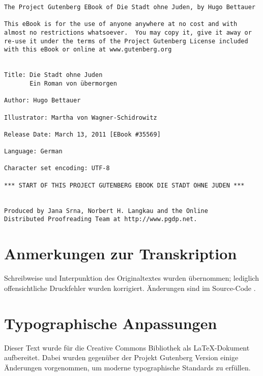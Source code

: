 \usepackage[german,ngerman]{babel}
\usepackage[T1]{fontenc}



\renewcommand*{\tb}[1]{\begin{center}#1\end{center}}
\newcommand*{\latein}[1]{#1}
\newcommand*{\unterschrift}[1]{\begin{flushright}#1\end{flushright}}
\newcommand*{\pagenum}[1]{\marginline{#1}}



\raggedbottom

\begin{Verbatim}[fontsize=\footnotesize]
The Project Gutenberg EBook of Die Stadt ohne Juden, by Hugo Bettauer

This eBook is for the use of anyone anywhere at no cost and with
almost no restrictions whatsoever.  You may copy it, give it away or
re-use it under the terms of the Project Gutenberg License included
with this eBook or online at www.gutenberg.org


Title: Die Stadt ohne Juden
       Ein Roman von übermorgen

Author: Hugo Bettauer

Illustrator: Martha von Wagner-Schidrowitz

Release Date: March 13, 2011 [EBook #35569]

Language: German

Character set encoding: UTF-8

*** START OF THIS PROJECT GUTENBERG EBOOK DIE STADT OHNE JUDEN ***


Produced by Jana Srna, Norbert H. Langkau and the Online
Distributed Proofreading Team at http://www.pgdp.net.
\end{Verbatim}

\section{Anmerkungen zur Transkription}

Schreibweise und Interpunktion des Originaltextes wurden
übernommen; lediglich offensichtliche Druckfehler wurden
korrigiert. Änderungen sind im Source-Code
.

\section{Typographische Anpassungen}
Dieser Text wurde für die Creative Commons Bibliothek als 
\LaTeX-Dokument aufbereitet. Dabei wurden gegenüber der 
Projekt Gutenberg Version einige Änderungen vorgenommen, um moderne
typographische Standards zu erfüllen.


